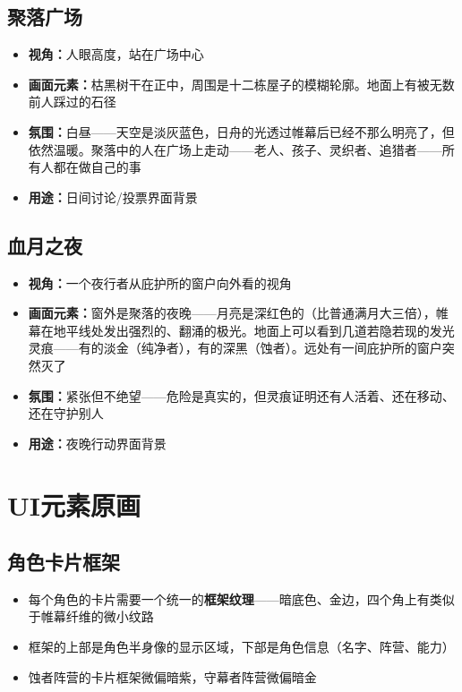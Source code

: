 \documentclass[12pt,a4paper,openany]{ctexbook}
\begin{document}
\section{聚落广场}
\begin{itemize}
    \item \textbf{视角：}人眼高度，站在广场中心
    \item \textbf{画面元素：}枯黑树干在正中，周围是十二栋屋子的模糊轮廓。地面上有被无数前人踩过的石径
    \item \textbf{氛围：}白昼——天空是淡灰蓝色，日舟的光透过帷幕后已经不那么明亮了，但依然温暖。聚落中的人在广场上走动——老人、孩子、灵织者、追猎者——所有人都在做自己的事
    \item \textbf{用途：}日间讨论/投票界面背景
\end{itemize}

\section{血月之夜}
\begin{itemize}
    \item \textbf{视角：}一个夜行者从庇护所的窗户向外看的视角
    \item \textbf{画面元素：}窗外是聚落的夜晚——月亮是深红色的（比普通满月大三倍），帷幕在地平线处发出强烈的、翻涌的极光。地面上可以看到几道若隐若现的发光灵痕——有的淡金（纯净者），有的深黑（蚀者）。远处有一间庇护所的窗户突然灭了
    \item \textbf{氛围：}紧张但不绝望——危险是真实的，但灵痕证明还有人活着、还在移动、还在守护别人
    \item \textbf{用途：}夜晚行动界面背景
\end{itemize}

\chapter{UI元素原画}

\section{角色卡片框架}
\begin{itemize}
    \item 每个角色的卡片需要一个统一的\textbf{框架纹理}——暗底色、金边，四个角上有类似于帷幕纤维的微小纹路
    \item 框架的上部是角色半身像的显示区域，下部是角色信息（名字、阵营、能力）
    \item 蚀者阵营的卡片框架微偏暗紫，守幕者阵营微偏暗金
\end{itemize}
\end{document}
